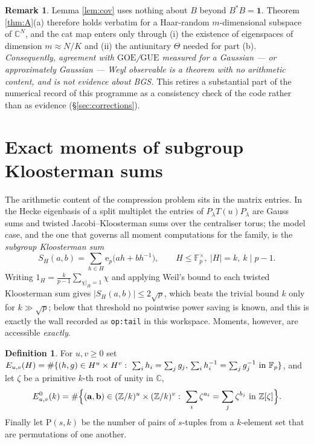 \documentclass[11pt,reqno]{amsart}
\theoremstyle{definition}
\newtheorem{remark}[theorem]{Remark}
\newtheorem{definition}[theorem]{Definition}
\newcommand{\FF}{\mathbb{F}}
\newcommand{\ZZ}{\mathbb{Z}}
\newcommand{\CC}{\mathbb{C}}
\newcommand{\ep}{\mathrm{e}_p}
\newcommand{\GUE}{\mathrm{GUE}}
\newcommand{\GOE}{\mathrm{GOE}}
\begin{document}
\begin{remark}\label{rem:no-arithmetic}
Lemma \ref{lem:cov} uses nothing about $B$ beyond $B^*B=\mathbf 1$.
Theorem \ref{thm:A}(a) therefore holds verbatim for a Haar-random
$m$-dimensional subspace of $\CC^N$, and the cat map enters only through
(i) the existence of eigenspaces of dimension $m\approx N/K$ and (ii) the
antiunitary $\Theta$ needed for part (b). \emph{Consequently, agreement with
$\GOE$/$\GUE$ measured for a Gaussian --- or approximately Gaussian --- Weyl
observable is a theorem with no arithmetic content, and is not evidence about
BGS.} This retires a substantial part of the numerical record of this programme
as a consistency check of the code rather than as evidence
(\S\ref{sec:corrections}).
\end{remark}

\section{Exact moments of subgroup Kloosterman sums}\label{sec:thmB}

The arithmetic content of the compression problem sits in the matrix entries. In
the Hecke eigenbasis of a split multiplet the entries of $P_\lambda T(u)
P_\lambda$ are Gauss sums and twisted Jacobi--Kloosterman sums over the
centraliser torus; the model case, and the one that governs all moment
computations for the family, is the \emph{subgroup Kloosterman sum}
\begin{equation}\label{eq:S}
  S_H(a,b)=\sum_{h\in H}\ep\bigl(ah+bh^{-1}\bigr),
  \qquad H\le\FF_p^\times,\ |H|=k,\ k\mid p-1 .
\end{equation}
Writing $1_H=\frac{k}{p-1}\sum_{\chi|_H=1}\chi$ and applying Weil's bound to each
twisted Kloosterman sum gives $|S_H(a,b)|\le 2\sqrt p$, which beats the trivial
bound $k$ only for $k\gg\sqrt p$; below that threshold no pointwise power saving
is known, and this is exactly the wall recorded as \texttt{op:tail} in this
workspace. Moments, however, are accessible \emph{exactly}.

\begin{definition}
For $u,v\ge0$ set
$E_{u,v}(H)=\#\{(h,g)\in H^u\times H^v:\ \sum_ih_i=\sum_jg_j,\\
\sum_ih_i^{-1}=\sum_jg_j^{-1}\ \text{in }\FF_p\}$, and let
$\zeta$ be a primitive $k$-th root of unity in $\CC$,
\[
  E^0_{u,v}(k)=\#\Bigl\{(\mathbf a,\mathbf b)\in(\ZZ/k)^u\times(\ZZ/k)^v:
  \ \sum_i\zeta^{a_i}=\sum_j\zeta^{b_j}\ \text{in }\ZZ[\zeta]\Bigr\}.
\]
Finally let $\mathrm{P}(s,k)$ be the number of pairs of $s$-tuples from a
$k$-element set that are permutations of one another.
\end{definition}
\end{document}
